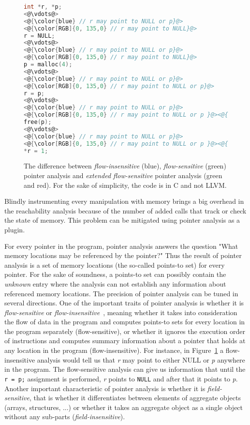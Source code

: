 \begin{figure}[t]
\begin{lstlisting}[language=C]
int *r, *p;
<@\vdots@>
<@{\color{blue} // r may point to NULL or p}@>
<@{\color[RGB]{0, 135,0} // r may point to NULL}@>
r = NULL;
<@\vdots@>
<@{\color{blue} // r may point to NULL or p}@>
<@{\color[RGB]{0, 135,0} // r may point to NULL}@>
p = malloc(4);
<@\vdots@>
<@{\color{blue} // r may point to NULL or p}@>
<@{\color[RGB]{0, 135,0} // r may point to NULL or p}@>
r = p;
<@\vdots@>
<@{\color{blue} // r may point to NULL or p}@>
<@{\color[RGB]{0, 135,0} // r may point to NULL or p }@><@{\color{red} or is invalidated}@>
free(p);
<@\vdots@>
<@{\color{blue} // r may point to NULL or p}@>
<@{\color[RGB]{0, 135,0} // r may point to NULL or p }@><@{\color{red} or is invalidated}@>
*r = 1;
\end{lstlisting}
\caption{The difference between \emph{flow-insensitive} (blue), \emph{flow-sensitive} (green) pointer analysis and \emph{extended flow-sensitive} pointer analysis (green and red). For the sake of simplicity, the code is in C and not LLVM.}
\label{fig:example2}
\end{figure}


Blindly instrumenting every manipulation with memory brings a big
overhead in the reachability analysis because of the number of added
calls that track or check the state of memory. This problem can be
mitigated using pointer analysis as a plugin.

For every pointer in the program, pointer analysis answers the
question "What memory locations may be referenced by the pointer?"
Thus the result of pointer analysis is a set of memory locations (the
so-called points-to set) for every pointer. For the sake of
soundness, a points-to set can possibly contain the \emph{unknown}
entry where the analysis can not establish any information about
referenced memory locations. The precision of pointer analysis can be
tuned in several directions. One of the important traits of pointer
analysis is whether it is \emph{flow-sensitive} or
\emph{flow-insensitive}~\cite{Hind01}, meaning whether it takes into
consideration the flow of data in the program and computes points-to
sets for every location in the program separately (flow-sensitive), or
whether it ignores the execution order of instructions and computes
summary information about a pointer that holds at any location in the
program (flow-insensitive). For instance, in
Figure~\ref{fig:example2} a flow-insensitive analysis would tell us
that \emph{r} may point to either NULL or \emph{p} anywhere in the
program. The flow-sensitive analysis can give us information that
until the \texttt{r = p;} assignment is performed, \emph{r} points to
\texttt{NULL} and after that it points to \emph{p}. Another important
characteristic of pointer analysis is whether it is
\emph{field-sensitive}, that is whether it differentiates between
elements of aggregate objects (arrays, structures, ...) or whether it
takes an aggregate object as a single object without any sub-parts
(\emph{field-insensitive}).


